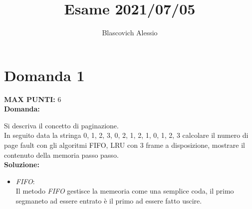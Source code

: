 \documentclass{article}
\title{Esame 2021/07/05}
\author{Blascovich Alessio}
\date{}
\begin{document}
    \maketitle
    \section*{Domanda 1}
    \textbf{MAX PUNTI:} 6\\
    \textbf{Domanda:}

    Si descriva il concetto di paginazione.\\
    In seguito data la stringa 0, 1, 2, 3, 0, 2, 1, 2, 1, 0, 1, 2, 3 calcolare il numero di page fault con gli algoritmi FIFO, LRU con 3 frame a disposizione, mostrare il contenuto della memoria passo passo.\\
    \textbf{Soluzione:}


    \begin{itemize}
        \item \emph{FIFO}:\\
            Il metodo \emph{FIFO} gestisce la memeoria come una semplice coda, il primo segmaneto ad essere entrato è il primo ad essere fatto uscire.\\
    \end{itemize}
\end{document}
